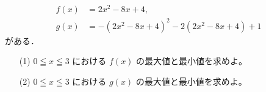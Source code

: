 \documentclass[8pt,dvipdfmx]{article}
\begin{document}
\begin{tcolorbox}[title=数学\textcircled{1} 1-3 AB]
\begin{align*}
f(x) &= 2x^2 - 8x + 4, \\
g(x) &= -\left(2x^2 - 8x + 4\right)^2 - 2(2x^2 - 8x + 4) + 1
\end{align*}
がある．
\begin{enumerate}
    \item[(1)] \(0 \leqq x \leqq 3\) における \(f(x)\) の最大値と最小値を求めよ。
    \vspace{2mm} %
    \item[(2)] \(0 \leqq x \leqq 3\) における \(g(x)\) の最大値と最小値を求めよ。
\end{enumerate}
\end{tcolorbox}

\end{document}
